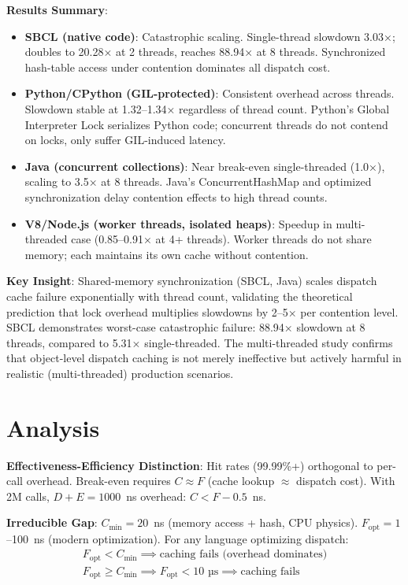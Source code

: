 \documentclass[sigplan,final,acmsmall,review,screen]{acmart}
\begin{document}
\textbf{Results Summary}:
\begin{itemize}
  \item \textbf{SBCL (native code)}: Catastrophic scaling. Single-thread slowdown 3.03×; doubles to 20.28× at 2 threads, reaches 88.94× at 8 threads.
    Synchronized hash-table access under contention dominates all dispatch cost.
  \item \textbf{Python/CPython (GIL-protected)}: Consistent overhead across threads. Slowdown stable at 1.32--1.34× regardless of thread count.
    Python's Global Interpreter Lock serializes Python code; concurrent threads do not contend on locks, only suffer GIL-induced latency.
  \item \textbf{Java (concurrent collections)}: Near break-even single-threaded (1.0×), scaling to 3.5× at 8 threads.
    Java's ConcurrentHashMap and optimized synchronization delay contention effects to high thread counts.
  \item \textbf{V8/Node.js (worker threads, isolated heaps)}: Speedup in multi-threaded case (0.85--0.91× at 4+ threads).
    Worker threads do not share memory; each maintains its own cache without contention.
\end{itemize}

\textbf{Key Insight}: Shared-memory synchronization (SBCL, Java) scales dispatch cache failure exponentially with thread count, validating the theoretical prediction that lock overhead multiplies slowdowns by 2--5× per contention level.
SBCL demonstrates worst-case catastrophic failure: 88.94× slowdown at 8 threads, compared to 5.31× single-threaded.
The multi-threaded study confirms that object-level dispatch caching is not merely ineffective but actively harmful in realistic (multi-threaded) production scenarios.

\section{Analysis}

\textbf{Effectiveness-Efficiency Distinction}: Hit rates (99.99\%+) orthogonal to per-call overhead. Break-even requires $C \approx F$ (cache lookup $\approx$ dispatch cost). With 2M calls, $D+E=1000$~ns overhead: $C < F - 0.5$~ns.

\textbf{Irreducible Gap}: $C_{\text{min}} = 20$~ns (memory access + hash, CPU physics). $F_{\text{opt}} = 1$--100~ns (modern optimization). For any language optimizing dispatch:
\begin{align}
F_{\text{opt}} < C_{\text{min}} \implies \text{caching fails (overhead dominates)} \\
F_{\text{opt}} \geq C_{\text{min}} \implies F_{\text{opt}} < 10\text{ µs} \implies \text{caching fails}
\end{align}
\end{document}
